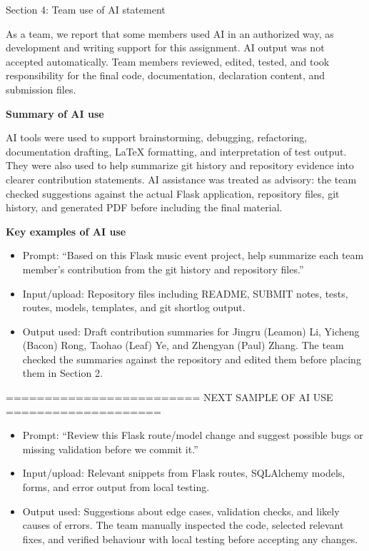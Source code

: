 \documentclass[12pt,a4paper]{article}
\newcommand{\blankline}{\vspace{\baselineskip}}
\newcommand{\sectitle}[1]{%
  {\fontsize{16pt}{19pt}\selectfont\color{headingGray}#1\par}%
}
\begin{document}
\blankline

\sectitle{Section 4: Team use of AI statement}

\blankline

As a team, we report that some members used AI in an authorized way, as
development and writing support for this assignment. AI output was not accepted
automatically. Team members reviewed, edited, tested, and took responsibility
for the final code, documentation, declaration content, and submission files.

\blankline

\textbf{Summary of AI use}

\blankline

AI tools were used to support brainstorming, debugging, refactoring,
documentation drafting, LaTeX formatting, and interpretation of test output.
They were also used to help summarize git history and repository evidence into
clearer contribution statements. AI assistance was treated as advisory: the team
checked suggestions against the actual Flask application, repository files, git
history, and generated PDF before including the final material.

\blankline
\blankline

\textbf{Key examples of AI use}

\begin{itemize}[leftmargin=.5in, label=\textbullet, topsep=0pt, itemsep=8pt, parsep=0pt]
  \item Prompt: ``Based on this Flask music event project, help summarize each team member's contribution from the git history and repository files.''
  \item Input/upload: Repository files including README, SUBMIT notes, tests, routes, models, templates, and git shortlog output.
  \item Output used: Draft contribution summaries for Jingru (Leamon) Li, Yicheng (Bacon) Rong, Taohao (Leaf) Ye, and Zhengyan (Paul) Zhang. The team checked the summaries against the repository and edited them before placing them in Section 2.
\end{itemize}

{\footnotesize ========================= NEXT SAMPLE OF AI USE ====================}

\begin{itemize}[leftmargin=.5in, label=\textbullet, topsep=0pt, itemsep=8pt, parsep=0pt]
  \item Prompt: ``Review this Flask route/model change and suggest possible bugs or missing validation before we commit it.''
  \item Input/upload: Relevant snippets from Flask routes, SQLAlchemy models, forms, and error output from local testing.
  \item Output used: Suggestions about edge cases, validation checks, and likely causes of errors. The team manually inspected the code, selected relevant fixes, and verified behaviour with local testing before accepting any changes.
\end{itemize}
\end{document}
